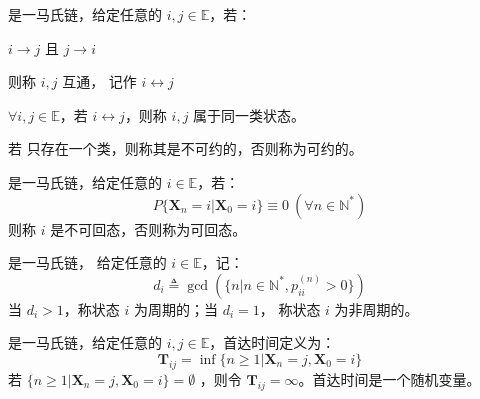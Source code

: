         \begin{definition}[互通]
            \MarkovChain 是一马氏链，给定任意的 $i, j \in \mathbb{E}$，若：
            
            \begin{center}
                $i \rightarrow j$ 且 $j \rightarrow i$
            \end{center}

            \noindent
            则称 $i, j$ 互通， 记作 $ i \leftrightarrow j$
        \end{definition}
        
        \begin{definition}[状态分类]
            $\forall i, j \in \mathbb{E}$，若 $i \leftrightarrow j$，则称 $i, j$ 属于同一类状态。
        \end{definition}

        \begin{definition}[可约与不可约]
            若 \MarkovChain 只存在一个类，则称其是不可约的，否则称为可约的。
        \end{definition}

        \begin{definition}[可回态与不可回态]
            \MarkovChain 是一马氏链，给定任意的 $i \in \mathbb{E}$，若：
            $$
            P\{\textbf{X}_n = i | \textbf{X}_0 = i\} \equiv 0\ (\forall n \in \mathbb{N}^*)
            $$
            则称 $i$ 是不可回态，否则称为可回态。
        \end{definition}

        \begin{definition}[周期与非周期]
            \MarkovChain 是一马氏链， 给定任意的 $i \in \mathbb{E}$，记：
            $$
            d_i \triangleq \gcd \left(\{n | n \in \mathbb{N}^*, p_{ii}^{(n)} > 0\}\right)
            $$
            当 $d_i > 1$，称状态 $i$ 为周期的；当 $d_i = 1$， 称状态 $i$ 为非周期的。
        \end{definition}

        \begin{definition}[首达时间]
            \MarkovChain 是一马氏链，给定任意的 $i, j \in \mathbb{E}$，首达时间定义为：
            $$
            \textbf{T}_{ij} = \inf\{ n \geq 1 | \textbf{X}_n = j, \textbf{X}_0 = i \}
            $$
            若 $\{ n \geq 1 | \textbf{X}_n = j, \textbf{X}_0 = i \} = \emptyset$ ，则令 $ \textbf{T}_{ij} = \infty$。首达时间是一个随机变量。
        \end{definition}

